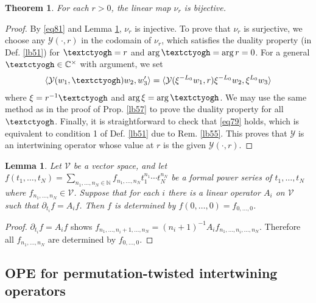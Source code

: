 \documentclass[11pt,b5paper,notitlepage]{article}
\theoremstyle{definition}
\theoremstyle{plain}
\newtheorem{thm}[df]{Theorem}
\newtheorem{lm}[df]{Lemma}
\newcommand{\mc}{\mathcal}
\newcommand{\bk}[1]{\langle {#1}\rangle}
\newcommand{\Cbb}{\mathbb C}
\newcommand{\Nbb}{\mathbb N}
\newcommand{\tipaz}{\text{\textctyogh}}
\numberwithin{equation}{subsection}
\begin{document}
\begin{thm}
For each $r>0$, the linear map $\nu_r$ is bijective.
\end{thm}


\begin{proof}
By \eqref{eq81} and Lemma \ref{lb68}, $\nu_r$ is injective. To prove that $\nu_r$ is surjective, we choose any $\mc Y(\cdot,r)$ in the codomain of $\nu_r$, which satisfies the duality property (in Def. \ref{lb51}) for $\tipaz=r$ and $\arg\tipaz=\arg r=0$. For a general $\tipaz\in\Cbb^\times$ with argument, we set
\begin{align*}
\bk{\mc Y(w_1,\tipaz)w_2,w_3'}=\bk{\mc Y(\xi^{-L_0}w_1,r)\xi^{-L_0}w_2,\xi^{L_0}w_3}	
\end{align*}
where $\xi=r^{-1}\tipaz$ and $\arg\xi=\arg\tipaz$. We may use the same method as in the proof of Prop. \ref{lb57} to prove the duality property for all $\tipaz$. Finally, it is straightforward to check that \eqref{eq79} holds, which is equivalent to condition 1 of Def. \ref{lb51} due to Rem. \ref{lb55}. This proves that $\mc Y$ is an intertwining operator whose value at $r$ is the given $\mc Y(\cdot,r)$.
\end{proof}

\begin{lm}\label{lb68}
Let $\mc V$ be a vector space, and let $f(t_1,\dots,t_N)=\sum_{n_1,\dots,n_N\in\Nbb}f_{n_1,\dots,n_N}t_1^{n_1}\cdots t_N^{n_N}$ be a formal power series of $t_1,\dots,t_N$ where  $f_{n_1,\dots,n_N}\in\mc V$. Suppose that for each $i$ there is a linear operator $A_i$ on $\mc V$ such that $\partial_{t_i}f=A_if$. Then $f$ is determined by $f(0,\dots,0)=f_{0,\dots,0}$.
\end{lm}


\begin{proof}
	$\partial_{t_i}f=A_if$ shows $f_{n_1,\dots,n_i+1,\dots,n_N}=(n_i+1)^{-1}A_if_{n_1,\dots,n_i,\dots,n_N}$. Therefore all $f_{n_1,\dots,n_N}$ are determined by $f_{0,\dots,0}$.
\end{proof}




\subsection{OPE for permutation-twisted intertwining operators}\label{lb71}
\end{document}
